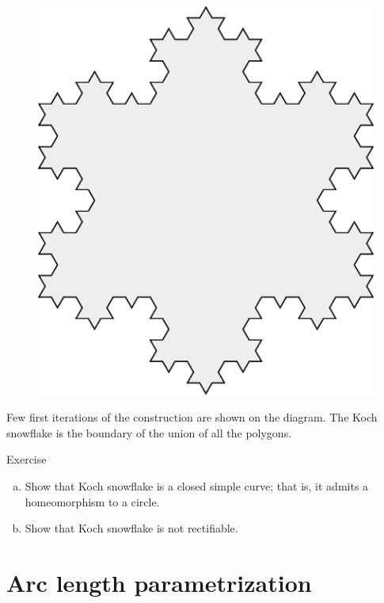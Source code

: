 \begin{figure}[h!]
\begin{minipage}{.24\textwidth}
\end{minipage}
\hfill
\begin{minipage}{.24\textwidth}
\centering
\includegraphics[scale=.15]{pics/Koch_Snowflake-3}
\end{minipage}
\end{figure}
Few first iterations of the construction are shown on the diagram.
The Koch snowflake is the boundary of the union of all the polygons.


\begin{thm}{Exercise}\label{ex:nonrectifiable-curve}
\begin{enumerate}[(a)]
\item Show that Koch snowflake is a closed simple curve; that is, it admits a homeomorphism to a circle.
\item\label{ex:nonrectifiable-curve:b} Show that Koch snowflake is not rectifiable. 
\end{enumerate}
\end{thm}


\section*{Arc length parametrization}

